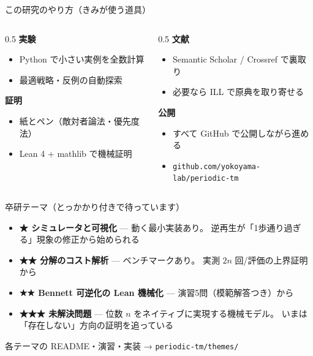 \documentclass[aspectratio=169,11pt]{beamer}
\begin{document}
\begin{frame}{この研究のやり方（きみが使う道具）}
  \begin{columns}
    \begin{column}{0.5\textwidth}
      \textbf{実験}
      \begin{itemize}
        \item Python で小さい実例を全数計算
        \item 最適戦略・反例の自動探索
      \end{itemize}
      \textbf{証明}
      \begin{itemize}
        \item 紙とペン（敵対者論法・優先度法）
        \item Lean 4 + mathlib で機械証明
      \end{itemize}
    \end{column}
    \begin{column}{0.5\textwidth}
      \textbf{文献}
      \begin{itemize}
        \item Semantic Scholar / Crossref で裏取り
        \item 必要なら ILL で原典を取り寄せる
      \end{itemize}
      \textbf{公開}
      \begin{itemize}
        \item すべて GitHub で公開しながら進める
        \item \texttt{github.com/yokoyama-lab/periodic-tm}
      \end{itemize}
    \end{column}
  \end{columns}
\end{frame}

\begin{frame}{卒研テーマ（とっかかり付きで待っています）}
  \begin{itemize}
    \item \textbf{★ シミュレータと可視化} --- 動く最小実装あり。
      逆再生が「1歩通り過ぎる」現象の修正から始められる
    \item \textbf{★★ 分解のコスト解析} --- ベンチマークあり。
      実測 \(2n\) 回/評価の上界証明から
    \item \textbf{★★ Bennett 可逆化の Lean 機械化} --- 演習5問（模範解答つき）から
    \item \textbf{★★★ 未解決問題} --- 位数 \(n\) をネイティブに実現する機械モデル。
      いまは「存在しない」方向の証明を追っている
  \end{itemize}
  \vspace{0.5em}
  \begin{center}
    各テーマの README・演習・実装 → \texttt{periodic-tm/themes/}
  \end{center}
\end{frame}
\end{document}
